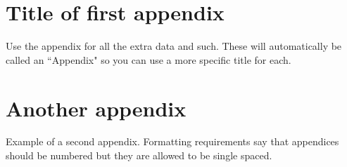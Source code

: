\documentclass[../main.tex]{subfiles}
\begin{document}
\appendix  %

\renewcommand{\thechapter}{\Roman{chapter}} %


\chapter{Title of first appendix}

Use the appendix for all the extra data and such.
These will automatically be called an ``Appendix" so you can use a more specific title for each.

\chapter{Another appendix}

Example of a second appendix.
Formatting requirements say that appendices should be numbered but they are allowed to be single spaced.
\end{document}
